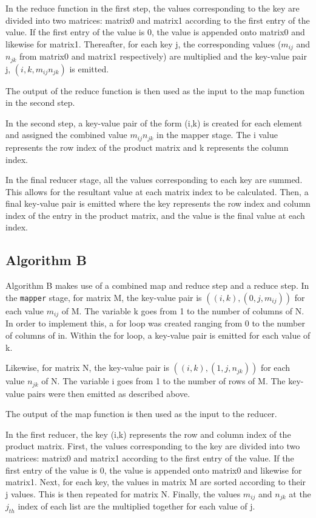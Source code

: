 \documentclass[10pt,twocolumn]{witseiepaper}
\begin{document}
In the reduce function in the first step, the values corresponding to the key are divided into two matrices: matrix0 and matrix1 according to the first entry of the value. If the first entry of the value is 0, the value is appended onto matrix0 and likewise for matrix1. Thereafter, for each key j, the corresponding values ($m_{ij}$ and $n_{jk}$ from matrix0 and matrix1 respectively) are multiplied and the key-value pair j, $(i, k, m_{ij}n_{jk})$ is emitted.

The output of the reduce function is then used as the input to the map function in the second step.

In the second step, a key-value pair of the form (i,k) is created for each element and assigned the combined value $m_{ij}n_{jk}$ in the mapper stage. The i value represents the row index of the product matrix and k represents the column index. 

In the final reducer stage, all the values corresponding to each key are summed. This allows for the resultant value at each matrix index to be calculated. Then, a final key-value pair is emitted where the key represents the row index and column index of the entry in the product matrix, and the value is the final value at each index.

\subsection{Algorithm B}

Algorithm B makes use of a combined map and reduce step and a reduce step. In the  \texttt{mapper} stage, for matrix M, the key-value pair is $((i, k), (0, j, m_{ij}))$ for each value $m_{ij}$ of M. The variable k goes from 1 to the number of columns of N. In order to implement this, a for loop was created ranging from 0 to the number of columns of in. Within the for loop, a key-value pair is emitted for each value of k.

Likewise, for matrix N, the key-value pair is $((i, k), (1, j, n_{jk}))$ for each value $n_{jk}$ of N. The variable i goes from 1 to the number of rows of M. The key-value pairs were then emitted as described above.
	
The output of the map function is then used as the input to the reducer. 

In the first reducer, the key (i,k) represents the row and column index of the product matrix. First, the values corresponding to the key are divided into two matrices: matrix0 and matrix1 according to the first entry of the value. If the first entry of the value is 0, the value is appended onto matrix0 and likewise for matrix1. Next, for each key, the values in matrix M are sorted according to their j values. This is then repeated for matrix N. Finally, the values $m_{ij}$ and $n_{jk}$ at the $j_{th}$ index of each list are the multiplied together for each value of j. 
\end{document}
